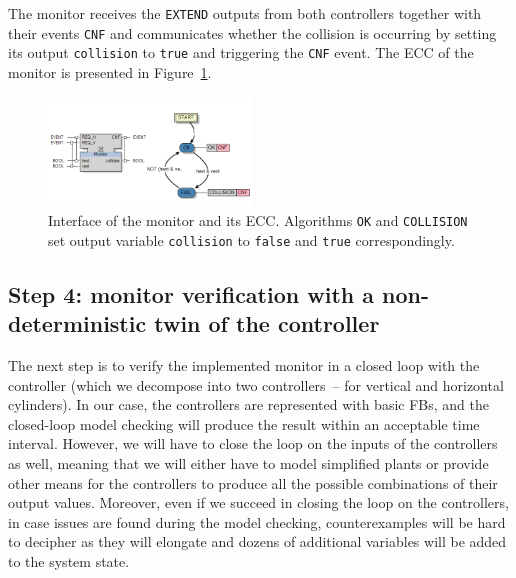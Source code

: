\documentclass[conference]{IEEEtran}
\begin{document}
The monitor receives the \texttt{EXTEND} outputs from both controllers together with their events \texttt{CNF} and communicates whether the collision is occurring by setting its output \texttt{collision} to \texttt{true} and triggering the \texttt{CNF} event. The ECC of the monitor is presented in Figure~\ref{fig:monitorecc}.



\begin{figure}[h!]
    \centering
    \includegraphics[width=0.48\textwidth]{pic/monitorecc.png}
    \caption{Interface of the monitor and its ECC. Algorithms \texttt{OK} and \texttt{COLLISION} set output variable \texttt{collision} to \texttt{false} and \texttt{true} correspondingly.}
    \label{fig:monitorecc}
\end{figure}

\subsection{Step 4: monitor verification with a non-deterministic twin of the controller }
\label{sec:monitorver}
The next step is to verify the implemented monitor in a closed loop with the controller (which we decompose into two controllers~-- for vertical and horizontal cylinders). In our case, the controllers are represented with basic FBs, and the closed-loop model checking will produce the result within an acceptable time interval. However, we will have to close the loop on the inputs of the controllers as well, meaning that we will either have to model simplified plants or provide other means for the controllers to produce all the possible combinations of their output values. Moreover, even if we succeed in closing the loop on the controllers, in case issues are found during the model checking, counterexamples will be hard to decipher as they will elongate and dozens of additional variables will be added to the system state.
\end{document}
